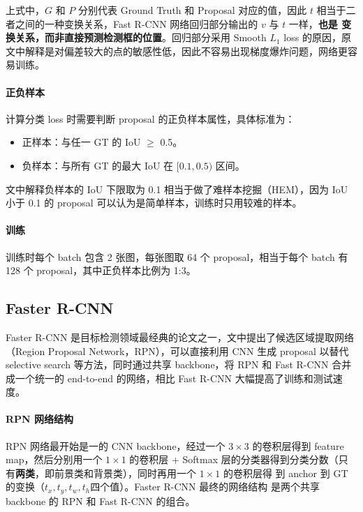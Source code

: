 上式中，$G$ 和 $P$ 分别代表 Ground Truth 和 Proposal 对应的值，因此 $t$ 相当于二
者之间的一种变换关系，Fast R-CNN 网络回归部分输出的 $v$ 与 $t$ 一样，\textbf{也是
  变换关系，而非直接预测检测框的位置}。回归部分采用 Smooth $L_1$ loss 的原因，原
文中解释是对偏差较大的点的敏感性低，因此不容易出现梯度爆炸问题，网络更容易训练。

\paragraph{正负样本}
计算分类 loss 时需要判断 proposal 的正负样本属性，具体标准为：

\begin{itemize}
  \item 正样本：与任一 GT 的 IoU $ \geq $ 0.5。
  \item 负样本：与所有 GT 的最大 IoU 在 $ [0.1, 0.5) $ 区间。
\end{itemize}

文中解释负样本的 IoU 下限取为 0.1 相当于做了难样本挖掘（HEM），因为 IoU 小于 0.1
的 proposal 可以认为是简单样本，训练时只用较难的样本。

\paragraph{训练}
训练时每个 batch 包含 2 张图，每张图取 64 个 proposal，相当于每个 batch 有 128
个 proposal，其中正负样本比例为 1:3。

\subsection{Faster R-CNN}
\label{subsec:Faster-R-CNN}

Faster R-CNN 是目标检测领域最经典的论文之一，文中提出了候选区域提取网络（Region
Proposal Network，RPN），可以直接利用 CNN 生成 proposal 以替代 selective search
等方法，同时通过共享 backbone，将 RPN 和 Fast R-CNN 合并成一个统一的 end-to-end
的网络，相比 Fast R-CNN 大幅提高了训练和测试速度。

\paragraph{RPN 网络结构} 
RPN 网络最开始是一的 CNN backbone，经过一个 $3 \times 3$ 的卷积层得到 feature
map，然后分别用一个 $1 \times 1$ 的卷积层 + Softmax 层的分类器得到分类分数（只
有\textbf{两类}，即前景类和背景类），同时再用一个 $1 \times 1$ 的卷积层得
到 anchor 到 GT 的变换（$t_x, t_y, t_w, t_h$四个值）。Faster R-CNN 最终的网络结构
是两个共享 backbone 的 RPN 和 Fast R-CNN 的组合。

